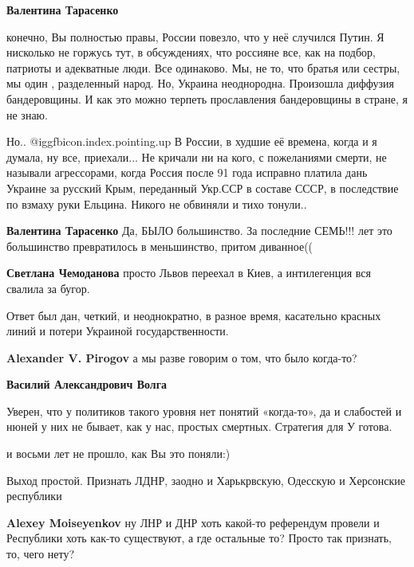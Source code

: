 \begin{itemize}
\begin{itemize}
\textbf{Валентина Тарасенко} 

конечно, Вы полностью правы, России повезло, что у неё случился Путин. Я
нисколько не горжусь тут, в обсуждениях, что россияне все, как на подбор,
патриоты и адекватные люди. Все одинаково. Мы, не то, что братья или сестры, мы
один , разделенный народ. Но, Украина неоднородна. Произошла диффузия
бандеровщины. И как это можно терпеть прославления бандеровщины в стране, я не
знаю.

Но.. @igg{fbicon.index.pointing.up} В России, в худшие её времена, когда и я думала, ну все, приехали... Не
кричали ни на кого, с пожеланиями смерти, не называли агрессорами, когда Россия
после 91 года исправно платила дань Украине за русский Крым, переданный Укр.ССР
в составе СССР, в последствие по взмаху руки Ельцина. Никого не обвиняли и тихо
тонули..

\textbf{Валентина Тарасенко} Да, БЫЛО большинство. За последние СЕМЬ!!! лет это большинство превратилось в меньшинство, притом диванное((

\textbf{Светлана Чемоданова} просто Львов переехал в Киев, а интилегенция вся свалила за бугор.

\end{itemize} %


Ответ был дан, четкий, и неоднократно, в разное время, касательно красных линий
и потери Украиной государственности.

\begin{itemize} %
\textbf{Alexander V. Pirogov} а мы разве говорим о том, что было когда-то?

\textbf{Василий Александрович Волга}

Уверен, что у политиков такого уровня нет понятий «когда-то», да и слабостей и
нюней у них не бывает, как у нас, простых смертных. Стратегия для У готова.

\end{itemize} %


и восьми лет не прошло, как Вы это поняли:)


Выход простой. Признать ЛДНР, заодно и Харькрвскую, Одесскую и Херсонские
республики

\begin{itemize} %
\textbf{Alexey Moiseyenkov} ну ЛНР и ДНР хоть какой-то референдум провели и Республики хоть как-то существуют, а где остальные то? Просто так признать, то, чего нету?
\end{itemize} %


\end{itemize}
